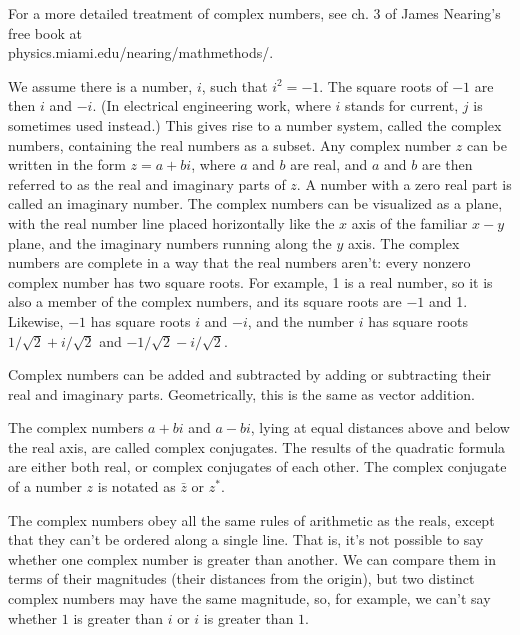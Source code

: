 For a more detailed treatment of complex numbers, see ch. 3 of
James Nearing's free book at \\
physics.miami.edu/nearing/mathmethods/.


We assume there is a number, $i$, such that $i^2=-1$.
The square roots of $-1$ are then $i$ and $-i$. (In electrical engineering work,
where $i$ stands for current, $j$ is sometimes used instead.) This gives rise
to a number system, called the complex numbers, containing the real numbers as a subset.
Any complex number $z$ can be written in the form $z=a+bi$, where $a$ and $b$ are
real, and $a$ and $b$ are then referred to as the real and imaginary parts of $z$.
A number with a zero real part is called an imaginary number.
The complex numbers can be visualized as a plane, with the real number line placed
horizontally like the $x$ axis of the familiar $x-y$ plane, and the imaginary numbers running
along the $y$ axis. The complex numbers are complete in a way that the real numbers
aren't: every nonzero complex number has two square roots. For example, 1 is
a real number, so it is also a member of the complex numbers, and its square roots
are $-1$ and 1. Likewise, $-1$ has square roots $i$ and $-i$, and the number $i$
has square roots $1/\sqrt{2}+i/\sqrt{2}$ and $-1/\sqrt{2}-i/\sqrt{2}$.


Complex numbers can be added and subtracted by adding or subtracting their real
and imaginary parts. Geometrically, this is the same as vector addition.


The complex numbers $a+bi$ and $a-bi$, lying at equal distances above and below the
real axis, are called complex conjugates. The results of the quadratic formula
are either both real, or complex conjugates of each other.
The complex conjugate of a number $z$ is notated as $\bar{z}$ or
$z^*$.

The complex numbers obey all the same rules of arithmetic as the reals, except that
they can't be ordered along a single line. That is, it's not possible to say whether
one complex number is greater than another. We can compare them in terms of their
magnitudes (their distances from the origin), but two distinct complex numbers may
have the same magnitude, so, for example, we can't say whether $1$ is greater than
$i$ or $i$ is greater than $1$.

